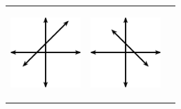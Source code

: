 \begin{center}
\begin{xtabular*}{\mytablewidth}[t]{|p{10\mystarwidth}|p{10\mystarwidth}|p{10\mystarwidth}|}
                  
    \setcounter{subfigure}{0}

\label{m39338*id238303}
    \begin{center}
    \label{m39338*id238303!!!underscore!!!media}\label{m39338*id238303!!!underscore!!!printimage}\includegraphics[width=100px]{col11306.imgs/m39338_MG10C11_006.png} %
        
      \vspace{2pt}
    \vspace{.1in}
    
    \end{center}



    \addtocounter{footnote}{-0}
    
                 &
    
    
        
                  
    \setcounter{subfigure}{0}

\label{m39338*id238315}
    \begin{center}
    \label{m39338*id238315!!!underscore!!!media}\label{m39338*id238315!!!underscore!!!printimage}\includegraphics[width=100px]{col11306.imgs/m39338_MG10C11_007.png} %
        
      \vspace{2pt}
    \vspace{.1in}
    
    \end{center}



    \addtocounter{footnote}{-0}
    
     \tabularnewline{}
    

\end{xtabular*}
\end{center}
